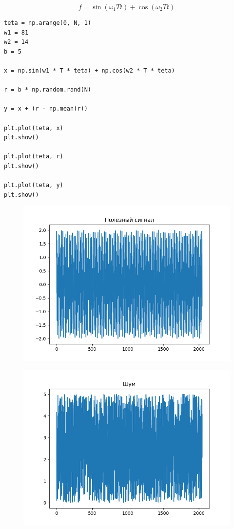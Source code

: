 \documentclass[12pt]{article}
\begin{document}
\[f = \sin(\omega_1 Tt) + \cos(\omega_2 Tt)\]


\begin{lstlisting}
teta = np.arange(0, N, 1)
w1 = 81
w2 = 14
b = 5

x = np.sin(w1 * T * teta) + np.cos(w2 * T * teta)

r = b * np.random.rand(N)

y = x + (r - np.mean(r))

plt.plot(teta, x)
plt.show()

plt.plot(teta, r)
plt.show()

plt.plot(teta, y)
plt.show()
\end{lstlisting}


\begin{figure}[!htb]
\centering
\includegraphics[scale=1.00]{good.png}
\caption{}
\label{}
\end{figure}

\begin{figure}[!htb]
\centering
\includegraphics[scale=1.00]{bad.png}
\caption{}
\label{}
\end{figure}
\end{document}
